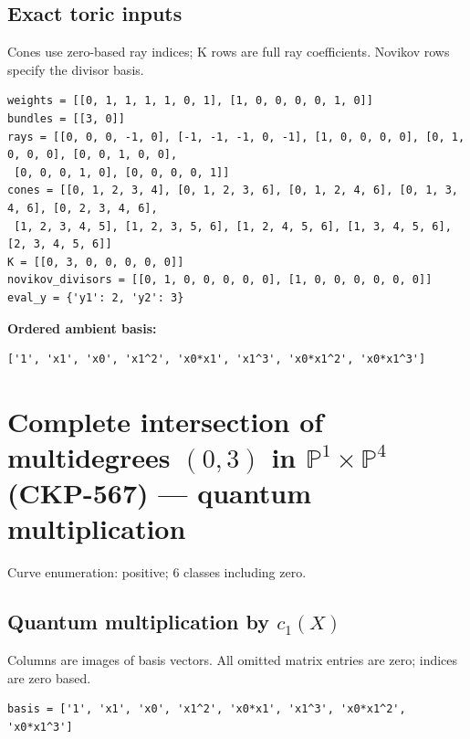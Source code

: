 \documentclass[10pt,a4paper]{article}
\begin{document}
\subsection*{Exact toric inputs}
Cones use zero-based ray indices; K rows are full ray coefficients. Novikov rows specify the divisor basis.

\begin{lstlisting}
weights = [[0, 1, 1, 1, 1, 0, 1], [1, 0, 0, 0, 0, 1, 0]]
bundles = [[3, 0]]
rays = [[0, 0, 0, -1, 0], [-1, -1, -1, 0, -1], [1, 0, 0, 0, 0], [0, 1, 0, 0, 0], [0, 0, 1, 0, 0],
 [0, 0, 0, 1, 0], [0, 0, 0, 0, 1]]
cones = [[0, 1, 2, 3, 4], [0, 1, 2, 3, 6], [0, 1, 2, 4, 6], [0, 1, 3, 4, 6], [0, 2, 3, 4, 6],
 [1, 2, 3, 4, 5], [1, 2, 3, 5, 6], [1, 2, 4, 5, 6], [1, 3, 4, 5, 6], [2, 3, 4, 5, 6]]
K = [[0, 3, 0, 0, 0, 0, 0]]
novikov_divisors = [[0, 1, 0, 0, 0, 0, 0], [1, 0, 0, 0, 0, 0, 0]]
eval_y = {'y1': 2, 'y2': 3}
\end{lstlisting}

\textbf{Ordered ambient basis:}
\begin{lstlisting}
['1', 'x1', 'x0', 'x1^2', 'x0*x1', 'x1^3', 'x0*x1^2', 'x0*x1^3']
\end{lstlisting}

\clearpage\section*{Complete intersection of multidegrees $(0,3)$ in $\mathbb P^{1}\times \mathbb P^{4}$ (CKP-567) --- quantum multiplication}

Curve enumeration: positive; 6 classes including zero.
\subsection*{Quantum multiplication by $c_1(X)$}
Columns are images of basis vectors. All omitted matrix entries are zero; indices are zero based.

\begin{lstlisting}
basis = ['1', 'x1', 'x0', 'x1^2', 'x0*x1', 'x1^3', 'x0*x1^2', 'x0*x1^3']
\end{lstlisting}
\end{document}

